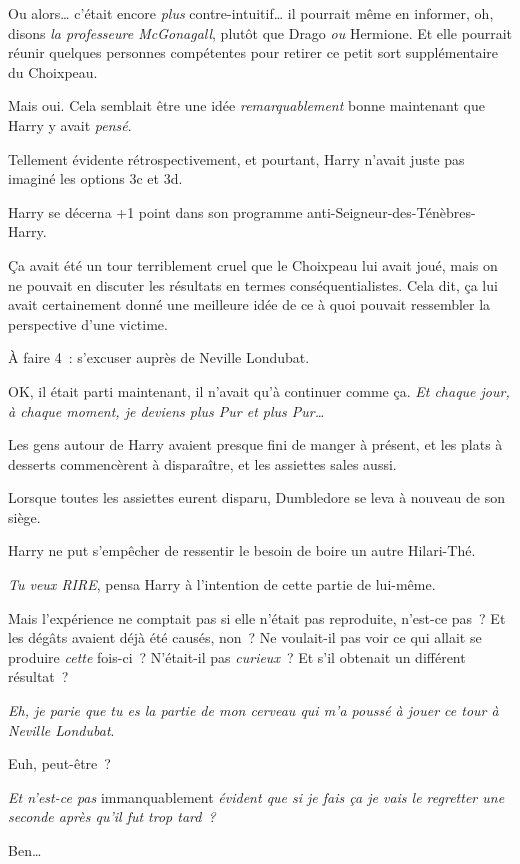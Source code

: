 Ou alors… c'était encore \emph{plus} contre-intuitif… il pourrait même en informer, oh, disons \emph{la professeure McGonagall}, plutôt que Drago \emph{ou} Hermione.
Et elle pourrait réunir quelques personnes compétentes pour retirer ce petit sort supplémentaire du Choixpeau.

Mais oui. Cela semblait être une idée \emph{remarquablement} bonne maintenant que Harry y avait \emph{pensé}.

Tellement évidente rétrospectivement, et pourtant, Harry n'avait juste pas imaginé les options 3c et 3d.

Harry se décerna +1 point dans son programme anti-Seigneur-des-Ténèbres-Harry.

Ça avait été un tour terriblement cruel que le Choixpeau lui avait joué, mais on ne pouvait en discuter les résultats en termes conséquentialistes. Cela dit, ça lui avait certainement donné une meilleure idée de ce à quoi pouvait ressembler la perspective d'une victime.

À faire 4~: s'excuser auprès de Neville Londubat.

OK, il était parti maintenant, il n'avait qu'à continuer comme ça. \emph{Et chaque jour, à chaque moment, je deviens plus Pur et plus Pur…}

Les gens autour de Harry avaient presque fini de manger à présent, et les plats à desserts commencèrent à disparaître, et les assiettes sales aussi.

Lorsque toutes les assiettes eurent disparu, Dumbledore se leva à nouveau de son siège.

Harry ne put s'empêcher de ressentir le besoin de boire un autre Hilari-Thé.

\emph{Tu veux RIRE}, pensa Harry à l'intention de cette partie de lui-même.

Mais l'expérience ne comptait pas si elle n'était pas reproduite, n'est-ce pas~? Et les dégâts avaient déjà été causés, non~? Ne voulait-il pas voir ce qui allait se produire \emph{cette} fois-ci~? N'était-il pas \emph{curieux}~? Et s'il obtenait un différent résultat~?

\emph{Eh, je parie que tu es la partie de mon cerveau qui m'a poussé à jouer ce tour à Neville Londubat}.

Euh, peut-être~?

\emph{Et n'est-ce pas} immanquablement \emph{évident que si je fais ça je vais le regretter une seconde après qu'il fut trop tard~?}

Ben…

